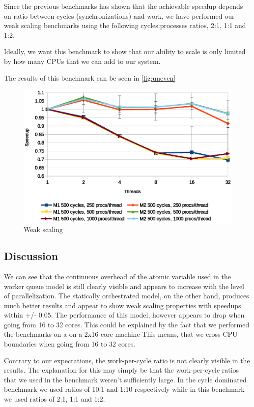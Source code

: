 Since the previous benchmarks has shown that the achievable speedup
depends on ratio between cycles (synchronizations) and work, we have
performed our weak scaling benchmarks using the following
cycles:processes ratios, 2:1, 1:1 and 1:2.

Ideally, we want this benchmark to show that our ability to scale is
only limited by how many CPUs that we can add to our system.

The results of this benchmark can be seen in \cref{fig:uneven}

\begin{figure}
\centering
\includegraphics[width=\textwidth]{graphs/weak}
\caption[Weak scaling benchmark]{Weak scaling}
\label{fig:weak}
\end{figure}

\subsection{Discussion}
We can see that the continuous overhead of the atomic variable used in
the worker queue model is still clearly visible and appears to
increase with the level of parallelization. The statically
orchestrated model, on the other hand, produces much better results
and appear to show weak scaling properties with speedups within +/-
0.05. The performance of this model, however appears to drop when
going from 16 to 32 cores. This could be explained by the fact that we
performed the benchmarks on a on a 2x16 core machine This means, that
we cross CPU boundaries when going from 16 to 32 cores.

Contrary to our expectations, the work-per-cycle ratio is not clearly
visible in the results. The explanation for this may simply be that
the work-per-cycle ratios that we used in the benchmark weren't
sufficiently large. In the cycle dominated benchmark we used ratios of
10:1 and 1:10 respectively while in this benchmark we used ratios of
2:1, 1:1 and 1:2.


